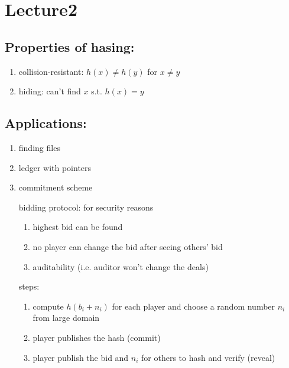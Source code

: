 \documentclass[../main.tex]{subfiles}
\begin{document}
\section{Lecture2}
\subsection{Properties of hasing:}
\begin{enumerate}
	\item collision-resistant: $h(x) \neq h(y)$ for $x \neq y$

	\item hiding: can't find $x$ s.t.  $h(x) = y$
\end{enumerate}

\subsection{Applications:}
\begin{enumerate}
	\item	finding files
	\item ledger with pointers
	\item commitment scheme

			bidding protocol: for security reasons
			\begin{enumerate}
				\item highest bid can be found
				\item no player can change the bid after seeing others' bid
				\item auditability (i.e. auditor won't change the deals)
			\end{enumerate}

			steps:
			\begin{enumerate}
				\item		compute $h(b_i + n_i)$ for each player and choose a random number  $n_i$ from large domain
				\item player publishes the hash (commit)
				\item player publish the bid and  $n_i$ for others to hash and verify (reveal)
			\end{enumerate}
\end{enumerate}
\end{document}
